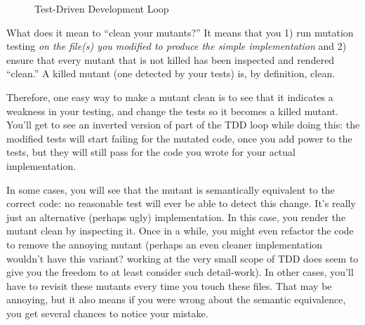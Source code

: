 \documentclass[sigplan,screen]{acmart}
\begin{document}
\begin{figure}[h!]
  \centering
  \caption{Test-Driven Development Loop}
  \label{fig:mdd}
\end{figure}

What does it mean to ``clean your mutants?''  It means that you 1) run
mutation testing \emph{on the file(s) you modified to produce the
  simple implementation} and 2) ensure that every mutant that is not
killed has been inspected and rendered ``clean.''  A killed mutant
(one detected by your tests) is, by definition, clean.

Therefore, one easy way to make a mutant clean is to see that
it indicates a weakness in your testing, and change the tests so it
becomes a killed mutant.  You'll
get to see an inverted version of part of the TDD loop while doing this:  the
modified tests will start failing for the mutated code, once you add power to
the tests, but  they will still pass for the code you wrote for your
actual implementation.

In some cases, you will see that the mutant is semantically equivalent
to the correct code: no reasonable test will ever be able to detect
this change.  It's really just an alternative (perhaps ugly)
implementation.  In this case, you render the mutant clean by
inspecting it.  Once in a while, you might even refactor the
code to remove the annoying mutant (perhaps an even cleaner implementation
wouldn't have this variant?  working at the very small scope of TDD
does seem to give you the freedom to at least consider such
detail-work).  In other cases, you'll have to revisit these mutants
every time you touch these files.  That may be annoying, but it also
means if you were wrong about the semantic equivalence, you get several
chances to notice your mistake.
\end{document}
